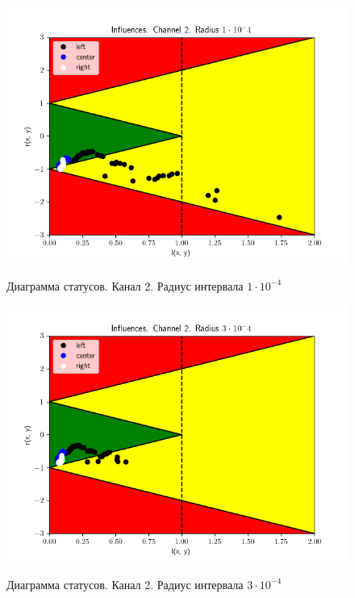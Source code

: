 \begin{figure}[H]
	\begin{center}
		\includegraphics[scale=0.83]{status_ch2_rad1}
		\label{pic:ch21}
		\caption{Диаграмма статусов. Канал 2. Радиус интервала $1 \cdot 10 ^ {-4}$}
	\end{center}
\end{figure}

\begin{figure}[H]
	\begin{center}
		\includegraphics[scale=0.83]{status_ch2_rad3}
		\label{pic:ch23}
		\caption{Диаграмма статусов. Канал 2. Радиус интервала $3 \cdot 10 ^ {-4}$}
	\end{center}
\end{figure}

